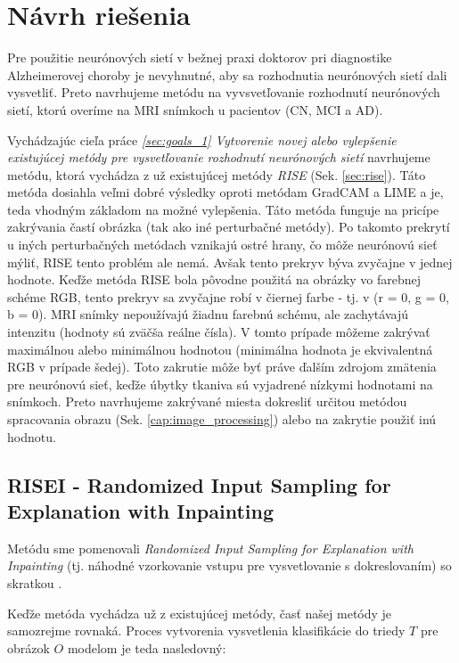 \chapter{Návrh riešenia}

Pre použitie neurónových sietí v bežnej praxi doktorov pri diagnostike Alzheimerovej choroby je nevyhnutné, aby sa rozhodnutia neurónových sietí dali vysvetliť. Preto navrhujeme metódu na vyvsvetľovanie rozhodnutí neurónových sietí, ktorú overíme na MRI snímkoch u pacientov (CN, MCI a AD).

Vychádzajúc cieľa práce \textit{\ref{sec:goals_1} Vytvorenie novej alebo vylepšenie existujúcej metódy pre vysvetľovanie rozhodnutí neurónových sietí} navrhujeme metódu, ktorá vychádza z už existujúcej metódy \textit{RISE} (Sek. \ref{sec:rise}). Táto metóda dosiahla veľmi dobré výsledky oproti metódam GradCAM a LIME a je, teda vhodným základom na možné vylepšenia. Táto metóda funguje na pricípe zakrývania častí obrázka (tak ako iné perturbačné metódy). Po takomto prekrytí u iných perturbačných metódach vznikajú ostré hrany, čo môže neurónovú sieť mýliť, RISE tento problém ale nemá. Avšak tento prekryv býva zvyčajne v jednej hodnote. Keďže metóda RISE bola pôvodne použitá na obrázky vo farebnej schéme RGB, tento prekryv sa zvyčajne robí v čiernej farbe - tj. v (r = 0, g = 0, b = 0). MRI snímky nepoužívajú žiadnu farebnú schému, ale zachytávajú intenzitu (hodnoty sú zväčša reálne čísla). V tomto prípade môžeme zakrývať maximálnou alebo minimálnou hodnotou (minimálna hodnota je ekvivalentná RGB v prípade šedej). Toto zakrutie môže byť práve ďalším zdrojom zmätenia pre neurónovú sieť, keďže úbytky tkaniva sú vyjadrené nízkymi hodnotami na snímkoch. Preto navrhujeme zakrývané miesta dokresliť určitou metódou spracovania obrazu (Sek. \ref{cap:image_processing}) alebo na zakrytie použiť inú hodnotu.

\section{RISEI - Randomized Input Sampling for Explanation with Inpainting}

Metódu sme pomenovali \textit{Randomized Input Sampling for Explanation with Inpainting} (tj. náhodné vzorkovanie vstupu pre vysvetlovanie s dokreslovaním) so skratkou .

Keďže metóda vychádza už z existujúcej metódy, časť našej metódy je samozrejme rovnaká. Proces vytvorenia vysvetlenia klasifikácie do triedy $T$ pre obrázok $O$ modelom je teda nasledovný:

